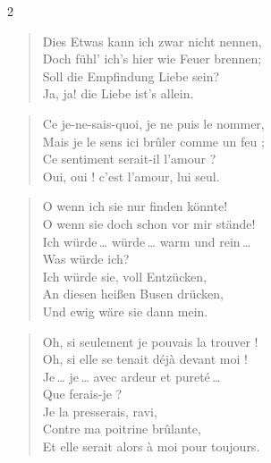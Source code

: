 \documentclass[a4paper,12pt]{article}
\newcommand\chunks[2]{%
\begin{leftcolumn*}\begin{otherlanguage}{german}%
{#1}%
\end{otherlanguage}\end{leftcolumn*}%
\begin{rightcolumn}\begin{otherlanguage}{french}%
{#2}%
\end{otherlanguage}\end{rightcolumn}%
}
\begin{document}
\begin{paracol}{2}
  \chunks{\begin{verse}
          Dies Etwas kann ich zwar nicht nennen,\\
          Doch fühl’ ich’s hier wie Feuer brennen;\\
          Soll die Empfindung Liebe sein?\\
          Ja, ja! die Liebe ist’s allein.
          \end{verse}}
         {\begin{verse}
          Ce je-ne-sais-quoi, je ne puis le nommer,\\
          Mais je le sens ici brûler comme un feu ;\\
          Ce sentiment serait-il l’amour ?\\
          Oui, oui ! c’est l’amour, lui seul.
          \end{verse}}

  \chunks{\begin{verse}
          O wenn ich sie nur finden könnte!\\
          O wenn sie doch schon vor mir stände!\\
          Ich würde\,\dots{} würde\,\dots{} warm und rein\,\dots{}\\
          Was würde ich?\\
          Ich würde sie, voll Entzücken,\\
          An diesen heißen Busen drücken,\\
          Und ewig wäre sie dann mein.
          \end{verse}}
         {\begin{verse}
          Oh, si seulement je pouvais la trouver !\\
          Oh, si elle se tenait déjà devant moi !\\
          Je\,\dots{} je\,\dots{} avec ardeur et pureté\,\dots{}\\
          Que ferais-je ?\\
          Je la presserais, ravi,\\
          Contre ma poitrine brûlante,\\
          Et elle serait alors à moi pour toujours.
          \end{verse}}
\end{paracol}
\end{document}
